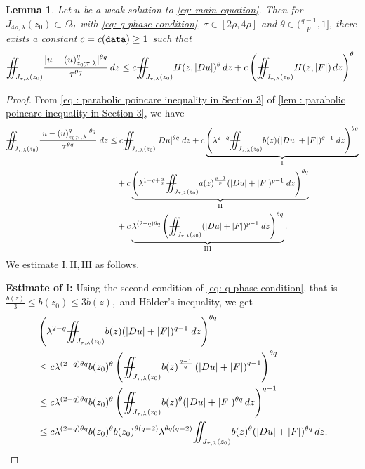 \documentclass[11pt,oneside, english,reqno,twoside a4paper]{amsart}
\newtheorem{lemma}{Lemma}[section]
\theoremstyle{definition}
\numberwithin{theorem}{section}
\numberwithin{equation}{section}
\newcommand{\iintss}{{\int\hspace{-0.28cm}\int}}
\newcommand{ \miints }{{\iintss\hspace{-0.56cm} -\hspace{-0.15cm}-}}
\newcommand{\miint}[1]{{\miints_{\hspace{-0.13cm}#1}}}
\begin{document}
 \begin{lemma} \label{lem:q-term of parabolic poincare inequality on q-intrinsic cylinders_1}
    Let $u$ be a weak solution to \eqref{eq: main equation}. Then for $J_{4\rho,\lambda}(z_0)\subset \Omega_T$ with \eqref{eq: q-phase condition}, $\tau \in [2\rho,4\rho]$ and $\theta \in (\frac{q-1}{p},1]$, there exists a constant $c=c(\textnormal{\texttt{data}}) \geq 1$ such that 
    \begin{align*}
        \miint{J_{\tau,\lambda}(z_0)}\frac{|u-(u)^q_{z_0;\tau,\lambda}|^{\theta q}}{\tau^{\theta q}}\, dz \leq c \miint{J_{\tau,\lambda}(z_0)}H(z,|Du|)^{\theta}\, dz
         +c\left(\miint{J_{\tau,\lambda}(z_0)}H(z,|F|) \, d z\right)^{\theta}.
    \end{align*} 
\end{lemma}
\begin{proof}
From \cref{eq : parabolic poincare inequality in Section 3} of \cref{lem : parabolic poincare inequality in Section 3}, we have
\begin{align*}
\miint{J_{\tau,\lambda}(z_0)}\frac{|u-(u)^q_{z_0;\tau,\lambda}|^{\theta q}}{\tau^{\theta q}}\; dz &\leq c\miint{J_{\tau,\lambda}(z_0)} |Du|^{\theta q} \; dz + c\underbrace{\left(\lambda^{2-q}\miint{J_{\tau,\lambda}(z_0)}b(z) (|Du|+|F|)^{q-1}\;dz \right)^{\theta q}}_{\mathrm{I}}\\
&\quad + c\underbrace{\left(\lambda^{1-q+\frac{q}{p}}\miint{J_{\tau,\lambda}(z_0)} a(z)^{\frac{p-1}{p}}(|Du|+|F|)^{p-1}\; dz \right)^{\theta q}}_{\mathrm{II}}\\
&\quad + c\underbrace{\lambda^{(2-q)\theta q}\left(\miint{J_{\tau,\lambda}(z_0)} (|Du|+|F|)^{p-1}\; dz \right)^{\theta q}}_{\mathrm{III}}.
\end{align*}
We estimate $\mathrm{I}, \mathrm{II}, \mathrm{III}$ as follows.

\noindent\textbf{Estimate of $\mathrm{I}$:} Using the second condition of \eqref{eq: q-phase condition}, that is $\frac{b(z)}{3}\leq b(z_0)\leq 3 b(z),$ and H\"{o}lder's inequality, we get
\begin{align*}
&\left(\lambda^{2-q}\miint{J_{\tau,\lambda}(z_0)}b(z) (|Du|+|F|)^{q-1}\;dz \right)^{\theta q}\\
&\leq c \lambda^{(2-q)\theta q} b(z_0)^{\theta} \left(\miint{J_{\tau, \lambda}(z_0)}b(z)^{\frac{q-1}{q}}\left(|Du|+|F|\right)^{q-1}\right)^{\theta q}\\
&\leq c\lambda^{(2-q)\theta q}b(z_0)^{\theta}\left(\miint{J_{\tau, \lambda}(z_0)}b(z)^{\theta}(|Du|+|F|)^{\theta q}\, dz\right)^{q-1}\\
&\leq c\lambda^{(2-q)\theta q}b(z_0)^{\theta}b(z_0)^{\theta (q-2)}\lambda^{\theta q(q-2)} \miint{J_{\tau, \lambda}(z_0)}b(z)^{\theta}(|Du|+|F|)^{\theta q}\, dz.
\end{align*}



\end{proof}
\end{document}
